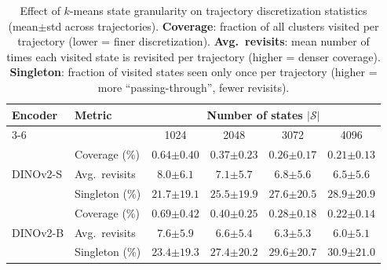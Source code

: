 \begin{table}[t]
\centering
\small
\caption{Effect of $k$-means state granularity on trajectory discretization statistics (mean$\pm$std across trajectories).
\textbf{Coverage}: fraction of all clusters visited per trajectory (lower = finer discretization).
\textbf{Avg.\ revisits}: mean number of times each visited state is revisited per trajectory (higher = denser coverage).
\textbf{Singleton}: fraction of visited states seen only once per trajectory (higher = more ``passing-through'', fewer revisits).}
\label{tab:state_granularity}
\setlength{\tabcolsep}{5pt}
\begin{tabular}{llcccc}
\hline
\multirow{2}{*}{\textbf{Encoder}} & \multirow{2}{*}{\textbf{Metric}}
    & \multicolumn{4}{c}{\textbf{Number of states} $|\mathcal{S}|$} \\
\cmidrule(lr){3-6}
    &  & 1024 & 2048 & 3072 & 4096 \\
\hline
\multirow{3}{*}{DINOv2-S} & Coverage (\%) & $0.64{\scriptstyle\pm0.40}$ & $0.37{\scriptstyle\pm0.23}$ & $0.26{\scriptstyle\pm0.17}$ & $0.21{\scriptstyle\pm0.13}$ \\
    & Avg.\ revisits & $8.0{\scriptstyle\pm6.1}$ & $7.1{\scriptstyle\pm5.7}$ & $6.8{\scriptstyle\pm5.6}$ & $6.5{\scriptstyle\pm5.6}$ \\
    & Singleton (\%) & $21.7{\scriptstyle\pm19.1}$ & $25.5{\scriptstyle\pm19.9}$ & $27.6{\scriptstyle\pm20.5}$ & $28.9{\scriptstyle\pm20.9}$ \\
\hline
\multirow{3}{*}{DINOv2-B} & Coverage (\%) & $0.69{\scriptstyle\pm0.42}$ & $0.40{\scriptstyle\pm0.25}$ & $0.28{\scriptstyle\pm0.18}$ & $0.22{\scriptstyle\pm0.14}$ \\
    & Avg.\ revisits & $7.6{\scriptstyle\pm5.9}$ & $6.6{\scriptstyle\pm5.4}$ & $6.3{\scriptstyle\pm5.3}$ & $6.0{\scriptstyle\pm5.1}$ \\
    & Singleton (\%) & $23.4{\scriptstyle\pm19.3}$ & $27.4{\scriptstyle\pm20.2}$ & $29.6{\scriptstyle\pm20.7}$ & $30.9{\scriptstyle\pm21.0}$ \\

\end{tabular}
\end{table}
